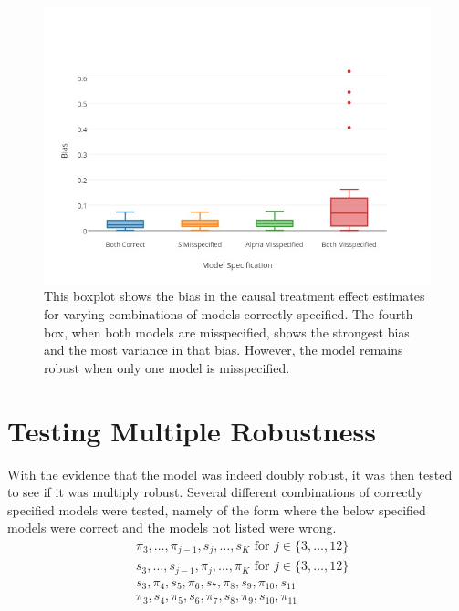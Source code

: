 \begin{figure}[h!] 
\includegraphics[width = \linewidth]{figures/boxplot.jpg}
\caption{This boxplot shows the bias in the causal treatment effect estimates for varying combinations of models correctly specified.  The fourth box, when both models are misspecified, shows the strongest bias and the most variance in that bias.  However, the model remains robust when only one model is misspecified.}
\label{boxplot}
\end{figure} 



\newpage
\section{Testing Multiple Robustness} \label{multiplerobust}
With the evidence that the model was indeed doubly robust, it was then tested to see if it was multiply robust.  Several different combinations of correctly specified models were tested, namely of the form where the below specified models were correct and the models not listed were wrong.  
\begin{align} 
& \pi_3, \dots, \pi_{j-1}, s_j, \dots, s_K \text{ for } j \in \{3, \dots, 12 \} \\
& s_3, \dots, s_{j-1}, \pi_j, \dots, \pi_K\text{ for } j \in \{3, \dots, 12 \}   \\
& s_3, \pi_4, s_5, \pi_6, s_7, \pi_8, s_9, \pi_{10}, s_{11}\\
& \pi_3, s_4, \pi_5, s_6, \pi_7, s_8, \pi_9, s_{10}, \pi_{11}
\end{align} 

